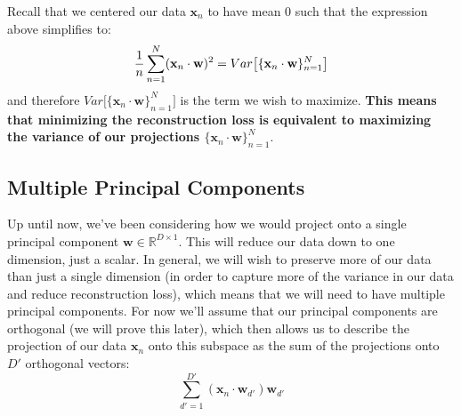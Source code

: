 Recall that we centered our data $\textbf{x}_{n}$ to have mean 0 such that the expression above simplifies to:
\begin{equation} \label{variance-equivalence}
    \frac{1}{n} \sum_{n=1}^{N} (\textbf{x}_{n} \cdot \textbf{w})^{2} = Var\big[\{\textbf{x}_{n} \cdot \textbf{w}\}_{n=1}^{N}\big] \\
\end{equation}
and therefore $Var\big[\{\textbf{x}_{n} \cdot \textbf{w}\}_{n=1}^{N}\big]$ is the term we wish to maximize. \textbf{This means that minimizing the reconstruction loss is equivalent to maximizing the variance of our projections $\{\textbf{x}_{n} \cdot \textbf{w}\}_{n=1}^{N}$}.


\subsection{Multiple Principal Components}
Up until now, we've been considering how we would project onto a single principal component $\textbf{w} \in \mathbb{R}^{D \times 1}$. This will reduce our data down to one dimension, just a scalar. In general, we will wish to preserve more of our data than just a single dimension (in order to capture more of the variance in our data and reduce reconstruction loss), which means that we will need to have multiple principal components. For now we'll assume that our principal components are orthogonal (we will prove this later), which then allows us to describe the projection of our data $\textbf{x}_{n}$ onto this subspace as the sum of the projections onto $D'$ orthogonal vectors:
\begin{equation} \label{orthogonal-projections}
    \sum_{d'=1}^{D'} (\textbf{x}_{n} \cdot \textbf{w}_{d'})\textbf{w}_{d'}
\end{equation}

